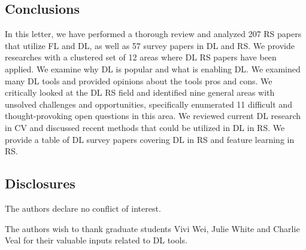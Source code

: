 \documentclass[12pt]{spieman}
\begin{document}
\begin{spacing}{1}
%
%
\section{Conclusions}
\label{sec:Conclusions}

In this letter, we have performed a thorough review and analyzed 207 RS papers that utilize FL and DL, as well as 57 survey papers in DL and RS. We provide researches with a clustered set of 12 areas where DL RS papers have been applied. We examine why DL is popular and what is enabling DL. We examined many DL tools and provided opinions about the tools pros and cons. We critically looked at the DL RS field and identified nine general areas with unsolved challenges and opportunities, specifically enumerated 11 difficult and thought-provoking open questions in this area. We reviewed current DL research in CV and discussed recent methods that could be utilized in DL in RS. We provide a table of DL survey papers covering DL in RS and feature learning in RS.

\subsection*{Disclosures}
The authors declare no conflict of interest.

%
%
\acknowledgments
The authors wish to thank graduate students Vivi Wei, Julie White and Charlie Veal for their valuable inputs related to DL tools.

%
%



\end{spacing}
\end{document}
